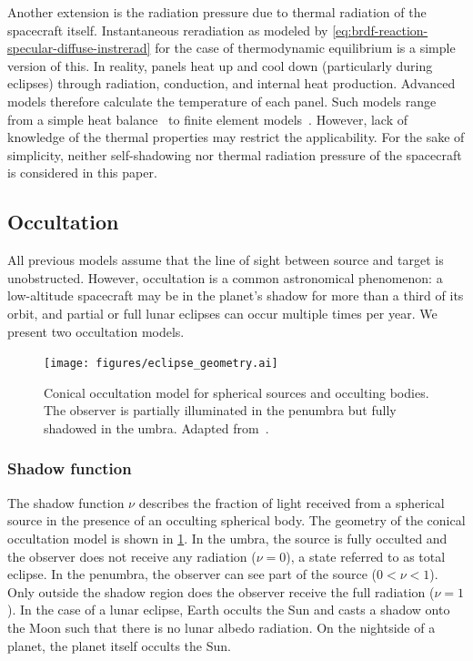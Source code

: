 Another extension is the radiation pressure due to thermal radiation of the spacecraft itself. Instantaneous reradiation as modeled by \cref{eq:brdf-reaction-specular-diffuse-instrerad} for the case of thermodynamic equilibrium is a simple version of this. In reality, panels heat up and cool down (particularly during eclipses) through radiation, conduction, and internal heat production. Advanced models therefore calculate the temperature of each panel. Such models range from a simple heat balance~\cite{Wetterer2014} to finite element models~\cite{Woeske2019}. However, lack of knowledge of the thermal properties may restrict the applicability. For the sake of simplicity, neither self-shadowing nor thermal radiation pressure of the spacecraft is considered in this paper.




\subsection{Occultation}
All previous models assume that the line of sight between source and target is unobstructed. However, occultation is a common astronomical phenomenon: a low-altitude spacecraft may be in the planet's shadow for more than a third of its orbit, and partial or full lunar eclipses can occur multiple times per year. We present two occultation models.

\begin{figure}[b]
    \centering
    \texttt{[image: figures/eclipse\_geometry.ai]}
    \caption{Conical occultation model for spherical sources and occulting bodies. The observer is partially illuminated in the penumbra but fully shadowed in the umbra. Adapted from~\cite{Vallado2013}.}
    \label{fig:eclipse-geometry}
\end{figure}

\subsubsection{Shadow function}
The shadow function $\nu$ describes the fraction of light received from a spherical source in the presence of an occulting spherical body. The geometry of the conical occultation model is shown in \cref{fig:eclipse-geometry}. In the umbra, the source is fully occulted and the observer does not receive any radiation ($\nu = 0$), a state referred to as total eclipse. In the penumbra, the observer can see part of the source ($0 < \nu < 1$). Only outside the shadow region does the observer receive the full radiation ($\nu = 1$). In the case of a lunar eclipse, Earth occults the Sun and casts a shadow onto the Moon such that there is no lunar albedo radiation. On the nightside of a planet, the planet itself occults the Sun.

